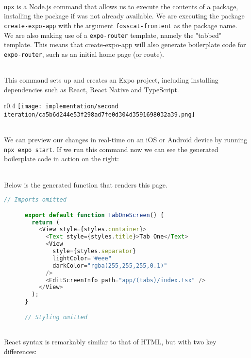 \documentclass[../../main.tex]{subfiles}
\begin{document}
\noindent \\ \lstinline{npx} is a Node.js command that allows us to execute the contents of a package,
installing the package if was not already available. We are executing the package \lstinline{create-expo-app}
with the argument \lstinline{fosscat-frontent} as the package name.
We are also making use of a \lstinline{expo-router} template, namely the "tabbed" template.
This means that create-expo-app will also generate boilerplate code for \lstinline{expo-router},
such as an initial home page (or route).

\noindent \\ This command sets up and creates an Expo project, including installing dependencies such as
React, React Native and TypeScript.

\begin{dummyenv}

  \begin{wrapfigure}{r}{0.4\textwidth}
    \texttt{[image: implementation/second iteration/ca5b6d244e53f298ad7fe0d304d3591698032a39.png]}
    \label{fig:wrapfig}
  \end{wrapfigure}

  \noindent \\ We can preview our changes in real-time on an iOS or Android device by running \lstinline{npx expo start}.
  If we run this command now we can see the generated boilerplate code in action on the right:

  \noindent \\ Below is the generated function that renders this page.

  \begin{lstlisting}[language=typescript, breaklines=false]
      // Imports omitted

      export default function TabOneScreen() {
        return (
          <View style={styles.container}>
            <Text style={styles.title}>Tab One</Text>
            <View
              style={styles.separator}
              lightColor="#eee"
              darkColor="rgba(255,255,255,0.1)"
            />
            <EditScreenInfo path="app/(tabs)/index.tsx" />
          </View>
        );
      }

      // Styling omitted
    \end{lstlisting}

  \noindent \\ React syntax is remarkably similar to that of HTML,
  but with two key differences:

\end{dummyenv}
\end{document}
